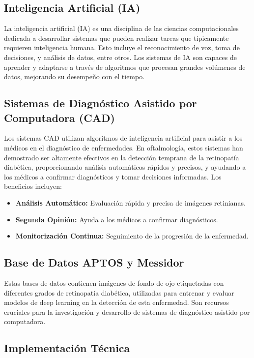 \subsection{Inteligencia Artificial (IA)}

La inteligencia artificial (IA) es una disciplina de las ciencias computacionales dedicada a desarrollar sistemas que pueden realizar tareas que típicamente requieren inteligencia humana. Esto incluye el reconocimiento de voz, toma de decisiones, y análisis de datos, entre otros. Los sistemas de IA son capaces de aprender y adaptarse a través de algoritmos que procesan grandes volúmenes de datos, mejorando su desempeño con el tiempo.

\subsection{Sistemas de Diagnóstico Asistido por Computadora (CAD)}

Los sistemas CAD utilizan algoritmos de inteligencia artificial para asistir a los médicos en el diagnóstico de enfermedades. En oftalmología, estos sistemas han demostrado ser altamente efectivos en la detección temprana de la retinopatía diabética, proporcionando análisis automáticos rápidos y precisos, y ayudando a los médicos a confirmar diagnósticos y tomar decisiones informadas. Los beneficios incluyen:

\begin{itemize}
 \item \textbf{Análisis Automático:} Evaluación rápida y precisa de imágenes retinianas.
 \item \textbf{Segunda Opinión:} Ayuda a los médicos a confirmar diagnósticos.
 \item \textbf{Monitorización Continua:} Seguimiento de la progresión de la enfermedad.
\end{itemize}

\subsection{Base de Datos APTOS y Messidor}

Estas bases de datos contienen imágenes de fondo de ojo etiquetadas con diferentes grados de retinopatía diabética, utilizadas para entrenar y evaluar modelos de deep learning en la detección de esta enfermedad. Son recursos cruciales para la investigación y desarrollo de sistemas de diagnóstico asistido por computadora.

\subsection{Implementación Técnica}

